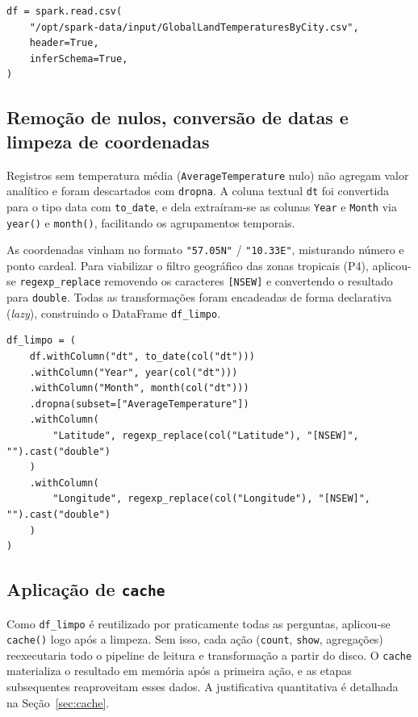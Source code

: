 \begin{lstlisting}[caption={Leitura da base de temperaturas com inferência de esquema.},label={lst:leitura}]
df = spark.read.csv(
    "/opt/spark-data/input/GlobalLandTemperaturesByCity.csv",
    header=True,
    inferSchema=True,
)
\end{lstlisting}

\subsection{Remoção de nulos, conversão de datas e limpeza de coordenadas}

Registros sem temperatura média (\texttt{AverageTemperature} nulo) não agregam valor
analítico e foram descartados com \texttt{dropna}. A coluna textual \texttt{dt} foi
convertida para o tipo data com \texttt{to\_date}, e dela extraíram-se as colunas
\texttt{Year} e \texttt{Month} via \texttt{year()} e \texttt{month()}, facilitando os
agrupamentos temporais.

As coordenadas vinham no formato \texttt{"57.05N"} / \texttt{"10.33E"}, misturando número
e ponto cardeal. Para viabilizar o filtro geográfico das zonas tropicais (P4), aplicou-se
\texttt{regexp\_replace} removendo os caracteres \texttt{[NSEW]} e convertendo o resultado
para \texttt{double}. Todas as transformações foram encadeadas de forma declarativa
(\textit{lazy}), construindo o DataFrame \texttt{df\_limpo}.

\begin{lstlisting}[caption={Conversão de datas, remoção de nulos e limpeza de coordenadas.},label={lst:limpeza}]
df_limpo = (
    df.withColumn("dt", to_date(col("dt")))
    .withColumn("Year", year(col("dt")))
    .withColumn("Month", month(col("dt")))
    .dropna(subset=["AverageTemperature"])
    .withColumn(
        "Latitude", regexp_replace(col("Latitude"), "[NSEW]", "").cast("double")
    )
    .withColumn(
        "Longitude", regexp_replace(col("Longitude"), "[NSEW]", "").cast("double")
    )
)
\end{lstlisting}

\subsection{Aplicação de \texttt{cache}}

Como \texttt{df\_limpo} é reutilizado por praticamente todas as perguntas, aplicou-se
\texttt{cache()} logo após a limpeza. Sem isso, cada ação (\texttt{count}, \texttt{show},
agregações) reexecutaria todo o pipeline de leitura e transformação a partir do disco. O
\texttt{cache} materializa o resultado em memória após a primeira ação, e as etapas
subsequentes reaproveitam esses dados. A justificativa quantitativa é detalhada na
Seção~\ref{sec:cache}.


